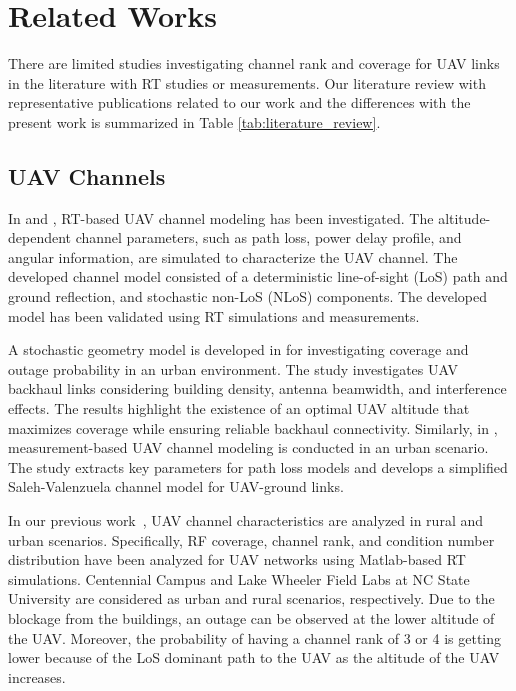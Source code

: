 \section{Related Works}
\label{ch:related_works}
There are limited studies investigating channel rank and coverage for UAV links in the literature with RT studies or measurements. Our literature review with representative publications related to our work and the differences with the present work is summarized in Table \ref{tab:literature_review}.

\subsection{UAV Channels}
In \cite{RT_channel_modeling} and \cite{RT_terahz_UAV}, RT-based UAV channel modeling has been investigated. The altitude-dependent channel parameters, such as path loss, power delay profile, and angular information, are simulated to characterize the UAV channel. The developed channel model consisted of a deterministic line-of-sight (LoS) path and ground reflection, and stochastic non-LoS (NLoS) components. The developed model has been validated using RT simulations and measurements.  

A stochastic geometry model is developed in \cite{uav_channel_model_arxiv} for investigating coverage and outage probability in an urban environment. The study investigates UAV backhaul links considering building density, antenna beamwidth, and interference effects. The results highlight the existence of an optimal UAV altitude that maximizes coverage while ensuring reliable backhaul connectivity. Similarly, in \cite{uav_channel_model_urban}, measurement-based UAV channel modeling is conducted in an urban scenario. The study extracts key parameters for path loss models and develops a simplified Saleh-Valenzuela channel model for UAV-ground links.

In our previous work~\cite{previous_work}, UAV channel characteristics are analyzed in rural and urban scenarios. Specifically, RF coverage, channel rank, and condition number distribution have been analyzed for UAV networks using Matlab-based RT simulations. Centennial Campus and Lake Wheeler Field Labs at NC State University are considered as urban and rural scenarios, respectively. Due to the blockage from the buildings, an outage can be observed at the lower altitude of the UAV. Moreover, the probability of having a channel rank of 3 or 4 is getting lower because of the LoS dominant path to the UAV as the altitude of the UAV increases.


